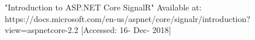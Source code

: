  "Introduction to ASP.NET Core SignalR" Available at: https://docs.microsoft.com/en-us/aspnet/core/signalr/introduction?view=aspnetcore-2.2 [Accessed: 16- Dec- 2018]
